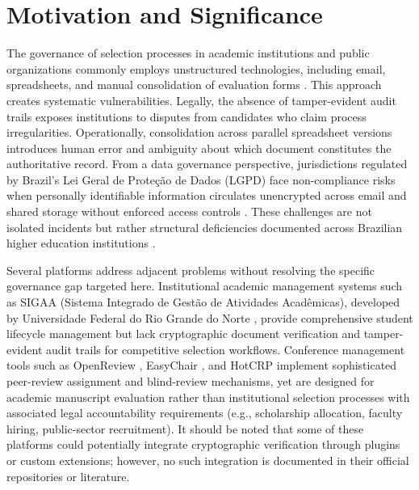 \documentclass[preprint,12pt,a4paper]{elsarticle}
\begin{document}
\section{Motivation and Significance}

The governance of selection processes in academic institutions and public organizations commonly employs unstructured technologies, including email, spreadsheets, and manual consolidation of evaluation forms \citep{Khan2021,Esposito2016}. This approach creates systematic vulnerabilities. Legally, the absence of tamper-evident audit trails exposes institutions to disputes from candidates who claim process irregularities. Operationally, consolidation across parallel spreadsheet versions introduces human error and ambiguity about which document constitutes the authoritative record. From a data governance perspective, jurisdictions regulated by Brazil's Lei Geral de Proteção de Dados (LGPD) \citep{LGPD2018} face non-compliance risks when personally identifiable information circulates unencrypted across email and shared storage without enforced access controls \citep{Cavoukian2011}. These challenges are not isolated incidents but rather structural deficiencies documented across Brazilian higher education institutions \citep{Machado2018}.

Several platforms address adjacent problems without resolving the specific governance gap targeted here. Institutional academic management systems such as SIGAA (Sistema Integrado de Gestão de Atividades Acadêmicas), developed by Universidade Federal do Rio Grande do Norte \citep{SIGAA2023}, provide comprehensive student lifecycle management but lack cryptographic document verification and tamper-evident audit trails for competitive selection workflows. Conference management tools such as OpenReview \citep{Soergel2013}, EasyChair \citep{EasyChair2024}, and HotCRP \citep{Kohler2004} implement sophisticated peer-review assignment and blind-review mechanisms, yet are designed for academic manuscript evaluation rather than institutional selection processes with associated legal accountability requirements (e.g., scholarship allocation, faculty hiring, public-sector recruitment). It should be noted that some of these platforms could potentially integrate cryptographic verification through plugins or custom extensions; however, no such integration is documented in their official repositories or literature.
\end{document}
